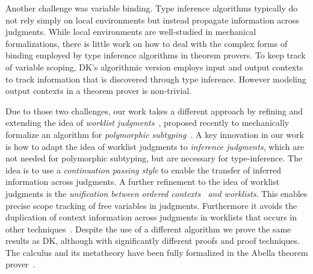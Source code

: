 Another challenge was variable binding. Type inference algorithms
typically do not rely simply on local environments but instead
propagate information across judgments. While local environments are
well-studied in mechanical formalizations, there is little work on how
to deal with the complex forms of binding employed by type inference algorithms
in theorem provers. To
keep track of variable scoping, DK's algorithmic version employs input
and output contexts to track information that is discovered through
type inference. However modeling output contexts in a theorem prover
is non-trivial.

Due to those two challenges, our work takes a different approach by refining and
extending the idea of \emph{worklist judgments}~\citep{itp2018},
proposed recently to mechanically formalize an algorithm for
\emph{polymorphic subtyping}~\citep{odersky1996putting}. A key innovation in our work is how
to adapt the idea of worklist judgments to
\emph{inference judgments}, which are not needed for polymorphic
subtyping, but are necessary for type-inference.  The idea is to use a \emph{continuation
passing style} to enable the transfer of inferred information across
judgments. A further refinement to the idea of worklist judgments is
the \emph{unification between ordered
  contexts~\citep{gundry2010type,dunfield2013complete} and worklists}.
This enables precise scope tracking of free variables in
judgments. Furthermore it avoids the duplication of context
information across judgments in worklists that occurs in other
techniques~\citep{Reed2009,Abel2011higher}.
Despite the use of a different algorithm we prove the
same results as DK, although with significantly different proofs and
proof techniques. The calculus and its metatheory
have been fully formalized in the Abella theorem prover~\citep{AbellaDesc}.



%





